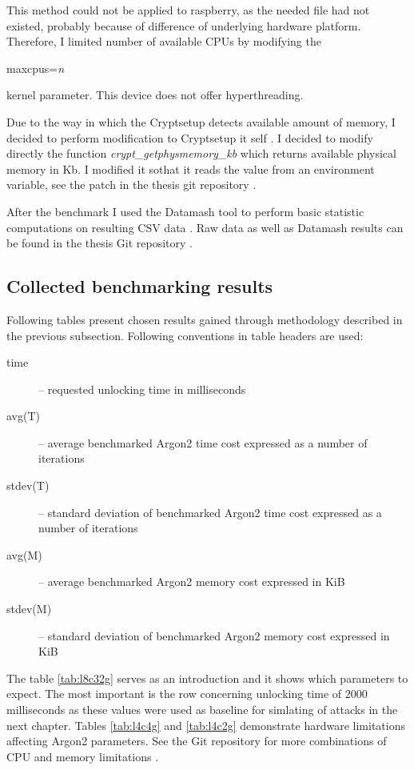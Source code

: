 \documentclass[nolof]{fithesis3}
\begin{document}
This method could not be applied to raspberry, as the needed file had not existed, probably because of difference of underlying hardware platform. Therefore, I limited number of available CPUs by modifying the 
\begin{tt}
maxcpus=\emph{n}
\end{tt}
 kernel parameter. This device does not offer hyperthreading.

Due to the way in which the Cryptsetup detects available amount of memory, I decided to perform modification to Cryptsetup it self \parencite{cryptsetuputils}. I decided to modify directly the function \emph{crypt\_getphysmemory\_kb} which returns available physical memory in Kb. I modified it sothat it reads the value from an environment variable, see the patch in the thesis git repository \parencite{thesisrepo}.

After the benchmark I used the Datamash tool to perform basic statistic computations on resulting CSV data \parencite{datamash}. Raw data as well as Datamash results can be found in the thesis Git repository \parencite{thesisrepo}.

\FloatBarrier

\subsection{Collected benchmarking results}
Following tables present chosen results gained through methodology described in the previous subsection. Following conventions  in table headers are used:

\begin{description}
\item[time] -- requested unlocking time in milliseconds

\item[avg(T)] -- average benchmarked Argon2 time cost expressed as a number of iterations

\item[stdev(T)] -- standard deviation of benchmarked Argon2 time cost expressed as a number of iterations

\item[avg(M)] -- average benchmarked Argon2 memory cost expressed in KiB

\item[stdev(M)] -- standard deviation of benchmarked Argon2 memory cost expressed in KiB
\end{description}

The table \ref{tab:l8c32g} serves as an introduction and it shows which parameters to expect. The most important is the row concerning unlocking time of 2000 milliseconds as these values were used as baseline for simlating of attacks in the next chapter. Tables \ref{tab:l4c4g} and \ref{tab:l4c2g} demonstrate hardware limitations affecting Argon2 parameters. See the Git repository for more combinations of CPU and memory limitations \parencite{thesisrepo}.
\end{document}

